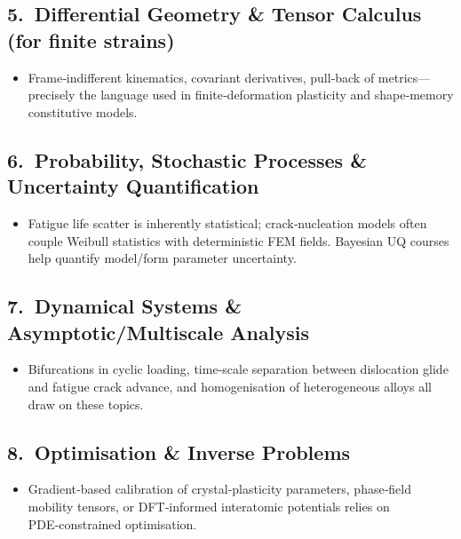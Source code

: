 \documentclass[12pt]{article}
\theoremstyle{definition} %
\theoremstyle{plain} %
\begin{document}
\subsection*{5.\  Differential Geometry \& Tensor Calculus (for finite strains)}
\begin{itemize}
  \item Frame‐indifferent kinematics, covariant derivatives, pull‑back of
        metrics—precisely the language used in finite‐deformation
        plasticity and shape‑memory constitutive models.
\end{itemize}

\subsection*{6.\  Probability, Stochastic Processes \& Uncertainty Quantification}
\begin{itemize}
  \item Fatigue life scatter is inherently statistical; crack‐nucleation
        models often couple Weibull statistics with deterministic FEM
        fields.  Bayesian UQ courses help quantify model/form parameter
        uncertainty.
\end{itemize}

\subsection*{7.\  Dynamical Systems \& Asymptotic/Multiscale Analysis}
\begin{itemize}
  \item Bifurcations in cyclic loading, time‐scale separation between
        dislocation glide and fatigue crack advance, and
        homogenisation of heterogeneous alloys all draw on these topics.
\end{itemize}

\subsection*{8.\  Optimisation \& Inverse Problems}
\begin{itemize}
  \item Gradient‐based calibration of crystal‐plasticity parameters,
        phase‐field mobility tensors, or DFT‐informed interatomic
        potentials relies on PDE‑constrained optimisation.
\end{itemize}
\end{document}
